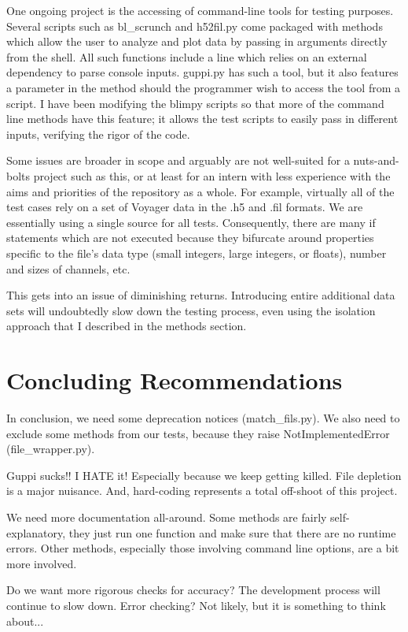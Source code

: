 \documentclass[12pt]{article}
\begin{document}
One ongoing project is the accessing of command-line tools for testing purposes. Several scripts such as bl\_scrunch and h52fil.py come packaged with methods which allow the user to analyze and plot data by passing in arguments directly from the shell. All such functions include a line which relies on an external dependency to parse console inputs. guppi.py has such a tool, but it also features a parameter in the method should the programmer wish to access the tool from a script. I have been modifying the blimpy scripts so that more of the command line methods have this feature; it allows the test scripts to easily pass in different inputs, verifying the rigor of the code.

Some issues are broader in scope and arguably are not well-suited for a nuts-and-bolts project such as this, or at least for an intern with less experience with the aims and priorities of the repository as a whole. For example, virtually all of the test cases rely on a set of Voyager data in the .h5 and .fil formats. We are essentially using a single source for all tests. Consequently, there are many if statements which are not executed because they bifurcate around properties specific to the file's data type (small integers, large integers, or floats), number and sizes of channels, etc.

This gets into an issue of diminishing returns. Introducing entire additional data sets will undoubtedly slow down the testing process, even using the isolation approach that I described in the methods section.

\section{Concluding Recommendations}

\quad \quad In conclusion, we need some deprecation notices (match\_fils.py). We also need to exclude some methods from our tests, because they raise NotImplementedError (file\_wrapper.py).

Guppi sucks!! I HATE it! Especially because we keep getting killed. File depletion is a major nuisance. And, hard-coding represents a total off-shoot of this project.

We need more documentation all-around. Some methods are fairly self-explanatory, they just run one function and make sure that there are no runtime errors. Other methods, especially those involving command line options, are a bit more involved.

Do we want more rigorous checks for accuracy? The development process will continue to slow down.
Error checking? Not likely, but it is something to think about...
\end{document}
